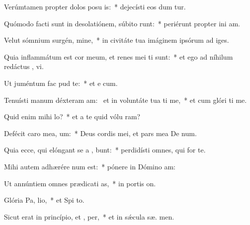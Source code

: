 \item Verúmtamen propter dolos posu is:~* dejecísti eos dum tur.
\item Quómodo facti sunt in desolatiónem, súbito runt:~* periérunt propter ini am.
\item Velut sómnium surgén, mine,~* in civitáte tua imáginem ipsórum ad  iges.
\item Quia inflammátum est cor meum, et renes mei ti sunt:~* et ego ad níhilum redáctus ,  vi.
\item Ut juméntum fac  pud te:~* et e  cum.
\item Tenuísti manum déxteram am:~\pscross{} et in voluntáte tua ti me,~* et cum glóri ti me.
\item Quid enim mihi   lo?~* et a te quid vólu  ram?
\item Defécit caro mea,   um:~* Deus cordis mei, et pars mea De  num.
\item Quia ecce, qui elóngant se a , bunt:~* perdidísti omnes, qui for  te.
\item Mihi autem adhærére  num est:~* pónere in Dómino   am:
\item Ut annúntiem omnes prædicati as,~* in portis  on.
\item Glória Pa,  lio,~* et Spi to.
\item Sicut erat in princípio, et ,  per,~* et in sǽcula sæ. men.
